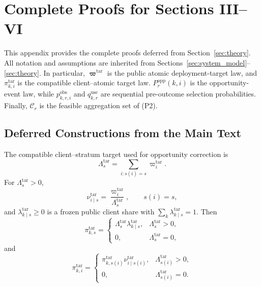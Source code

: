 \appendices
\section{Complete Proofs for Sections III--VI}
\label{app:complete_proofs}

This appendix provides the complete proofs deferred from
Section~\ref{sec:theory}.  All notation and assumptions are inherited from
Sections~\ref{sec:system_model}--\ref{sec:theory}.  In particular,
$\boldsymbol\varpi^{\mathrm{tar}}$ is the public atomic deployment-target law,
and $\pi^{\mathrm{tar}}_{k,i}$ is the compatible client--atomic target law.
$P_r^{\mathrm{opp}}(k,i)$ is the opportunity-event law, while
$p^{\mathrm{obs}}_{k,r,i}$ and $q^{\mathrm{use}}_{k,r}$ are sequential
pre-outcome selection probabilities.  Finally, $\mathcal{C}_r$ is the feasible
aggregation set of (P2).

\subsection{Deferred Constructions from the Main Text}
\label{app:deferred_constructions}

The compatible client--stratum target used for opportunity correction is
\begin{equation}
    \Lambda_s^{\mathrm{tar}}
    =
    \sum_{i:s(i)=s}\varpi_i^{\mathrm{tar}}.
    \label{eq:target_stratum_mass}
\end{equation}
For $\Lambda_s^{\mathrm{tar}}>0$,
\begin{equation}
    \nu^{\mathrm{tar}}_{i\mid s}
    =
    \frac{\varpi_i^{\mathrm{tar}}}
         {\Lambda_s^{\mathrm{tar}}},
    \qquad s(i)=s,
    \label{eq:target_conditional_atomic}
\end{equation}
and $\lambda^{\mathrm{tar}}_{k\mid s}\ge0$ is a frozen public client share
with $\sum_k\lambda^{\mathrm{tar}}_{k\mid s}=1$.  Then
\begin{equation}
 \pi^{\mathrm{tar}}_{k,s}
 =
 \begin{cases}
 \Lambda_s^{\mathrm{tar}}\lambda^{\mathrm{tar}}_{k\mid s},
 & \Lambda_s^{\mathrm{tar}}>0,\\
 0, & \Lambda_s^{\mathrm{tar}}=0,
 \end{cases}
 \label{eq:target_ks_mass}
\end{equation}
and
\begin{equation}
 \pi^{\mathrm{tar}}_{k,i}
 =
 \begin{cases}
 \pi^{\mathrm{tar}}_{k,s(i)}
 \nu^{\mathrm{tar}}_{i\mid s(i)},
 & \Lambda_{s(i)}^{\mathrm{tar}}>0,\\
 0, & \Lambda_{s(i)}^{\mathrm{tar}}=0.
 \end{cases}
 \label{eq:target_ki_mass}
\end{equation}


